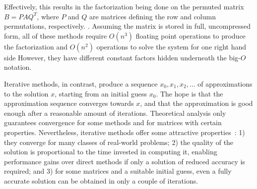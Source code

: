 Effectively, this results
in the factorization being done on the permuted matrix $B = P A Q^T$, where $P$
and $Q$ are matrices defining the row and column permutations, respectively.
.
Assuming the matrix is stored in full, uncompressed form, all of these methods
require $O(n^3)$ floating point operations to produce the factorization and
$O(n^2)$ operations to solve the system for one right hand side  
However, they have different constant factors hidden underneath the big-$O$
notation.

Iterative methods, in contrast, produce a sequence $x_0, x_1, x_2, \ldots$ of
approximations to the solution $x$, starting from an initial guess $x_0$. The
hope is that the approximation sequence converges towards $x$, and that the
approximation is
good enough after a reasonable amount of iterations. Theoretical analysis only
guarantees convergence for some methods and for matrices with certain
properties. Nevertheless, iterative methods offer some attractive
properties~\cite{saad}: 1) they converge for many classes of real-world
problems; 2) the quality of the solution is proportional to the time
invested in computing it, enabling performance gains over direct methods if only
a solution of reduced accuracy is required; and 3) for some matrices and a
suitable initial guess, even a fully accurate solution can be obtained in only a
couple of iterations.

